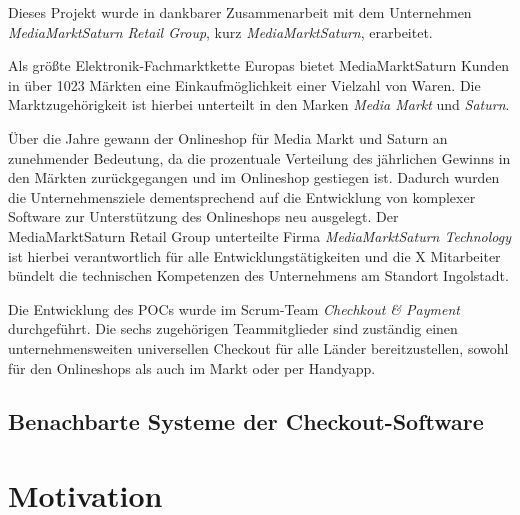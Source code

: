 
Dieses Projekt wurde in dankbarer Zusammenarbeit mit dem Unternehmen \emph{MediaMarktSaturn Retail Group}, kurz \emph{MediaMarktSaturn}, erarbeitet. %

Als größte Elektronik-Fachmarktkette Europas bietet MediaMarktSaturn Kunden in über 1023 Märkten eine Einkaufmöglichkeit einer Vielzahl von Waren. Die Marktzugehörigkeit ist hierbei unterteilt in den Marken \emph{Media Markt} und \emph{Saturn}. %

Über die Jahre gewann der Onlineshop für Media Markt und Saturn an zunehmender Bedeutung, da die prozentuale Verteilung des jährlichen Gewinns in den Märkten zurückgegangen und im Onlineshop gestiegen ist. Dadurch wurden die Unternehmensziele dementsprechend auf die Entwicklung von komplexer Software zur Unterstützung des Onlineshops neu ausgelegt. Der MediaMarktSaturn Retail Group unterteilte Firma \emph{MediaMarktSaturn Technology} ist hierbei verantwortlich für alle Entwicklungstätigkeiten und die {\color{red}X} Mitarbeiter bündelt die technischen Kompetenzen des Unternehmens am Standort Ingolstadt. %

Die Entwicklung des \acrshort{POC}s wurde im \Gls{Scrum}-Team \emph{Chechkout \& Payment} durchgeführt. Die sechs zugehörigen Teammitglieder sind zuständig einen unternehmensweiten universellen Checkout für alle Länder bereitzustellen, sowohl für den Onlineshops als auch im Markt oder per Handyapp. 

\subsection{Benachbarte Systeme der Checkout-Software}

\section{Motivation}



